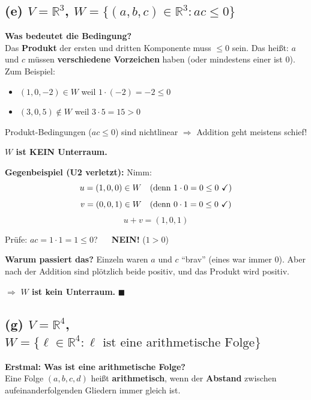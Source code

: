 \documentclass[a4paper,12pt]{article}
\begin{document}
\subsection*{(e) \quad $V = \mathbb{R}^3$, \quad $W = \{(a,b,c) \in \mathbb{R}^3 : ac \leq 0\}$}

\textbf{Was bedeutet die Bedingung?}\\
Das \textbf{Produkt} der ersten und dritten Komponente muss $\leq 0$ sein. Das hei\ss t: $a$ und $c$ m\"ussen \textbf{verschiedene Vorzeichen} haben (oder mindestens einer ist $0$). Zum Beispiel:
\begin{itemize}
    \item $(1, 0, -2) \in W$ weil $1 \cdot (-2) = -2 \leq 0$ \checkmark
    \item $(3, 0, 5) \notin W$ weil $3 \cdot 5 = 15 > 0$ \Lightning
\end{itemize}

\begin{merkbox}
Produkt-Bedingungen ($ac \leq 0$) sind nichtlinear $\Rightarrow$ Addition geht meistens schief!
\end{merkbox}

\textbf{$W$ ist KEIN Unterraum.}

\textbf{Gegenbeispiel (U2 verletzt):} Nimm:
\[
u = (1, 0, 0) \in W \quad \text{(denn } 1 \cdot 0 = 0 \leq 0 \text{ \checkmark)}
\]
\[
v = (0, 0, 1) \in W \quad \text{(denn } 0 \cdot 1 = 0 \leq 0 \text{ \checkmark)}
\]
\[
u + v = (1, 0, 1)
\]

Pr\"ufe: $ac = 1 \cdot 1 = 1 \leq 0$? $\quad$ \textbf{NEIN!} ($1 > 0$) \quad \Lightning

\textbf{Warum passiert das?} Einzeln waren $a$ und $c$ ``brav'' (eines war immer $0$). Aber nach der Addition sind pl\"otzlich beide positiv, und das Produkt wird positiv.

$\Rightarrow$ \textbf{$W$ ist kein Unterraum.} \hfill $\blacksquare$

\subsection*{(g) \quad $V = \mathbb{R}^4$, \quad $W = \{\ell \in \mathbb{R}^4 : \ell \text{ ist eine arithmetische Folge}\}$}

\textbf{Erstmal: Was ist eine arithmetische Folge?}\\
Eine Folge $(a, b, c, d)$ hei\ss t \textbf{arithmetisch}, wenn der \textbf{Abstand} zwischen aufeinanderfolgenden Gliedern immer gleich ist.
\end{document}

